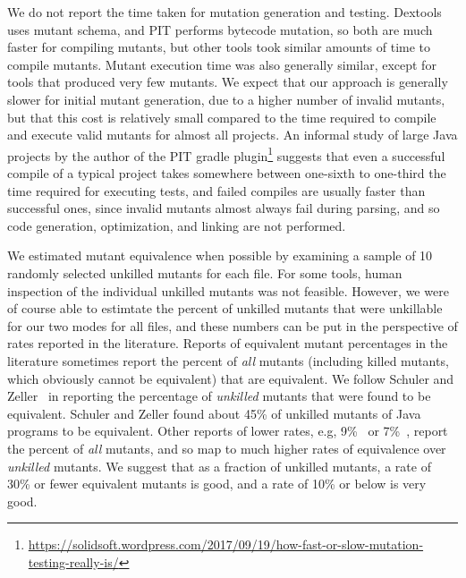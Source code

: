 \documentclass[sigconf,review, anonymous]{acmart}
\begin{document}
{We do not report the time taken for mutation generation and testing.
Dextools uses mutant schema, and PIT performs bytecode mutation, so
both are much faster for compiling mutants, but other tools took similar
amounts of time to compile mutants.   Mutant execution time was also
generally similar, except for tools that produced very few mutants.
We expect that our approach is generally slower for initial mutant
generation, due to a higher number of invalid mutants, but that this
cost is relatively small compared to the time required to compile and
execute valid mutants for almost all projects.  An informal study of
large Java projects by the author of the PIT gradle
plugin\footnote{\url{https://solidsoft.wordpress.com/2017/09/19/how-fast-or-slow-mutation-testing-really-is/}}
  suggests that even a successful compile of a typical project takes
  somewhere between one-sixth to one-third the time required for
  executing tests, and failed compiles are usually faster than
  successful ones, since invalid mutants almost always fail during
  parsing, and so code generation, optimization, and linking are not performed.

We estimated mutant equivalence when possible by examining a sample of
10 randomly selected unkilled mutants for each file.  For some tools,
human inspection of the individual unkilled mutants was not feasible.
However, we were of course able to estimtate the percent of unkilled
mutants that were unkillable for our two modes for all files, and
these numbers can be put in the perspective of rates reported in the
literature.  Reports of equivalent mutant percentages in the
literature sometimes report the percent of \emph{all} mutants
(including killed mutants, which obviously cannot be equivalent) that
are equivalent.  We follow Schuler and Zeller~\cite{EquivMut} in
reporting the percentage of \emph{unkilled} mutants that were found to
be equivalent.  Schuler and Zeller found about 45\% of unkilled
mutants of Java programs to be equivalent.  Other reports of lower
rates, e.g, 9\%~\cite{offutt1997automatically} or 7\%~\cite{TCE}, report the percent of
\emph{all} mutants, and so map to much higher rates of
equivalence over \emph{unkilled} mutants.  We suggest that as a
fraction of unkilled mutants, a rate of 30\% or fewer equivalent
mutants is good, and a rate of 10\% or below is very good.

}
\end{document}
